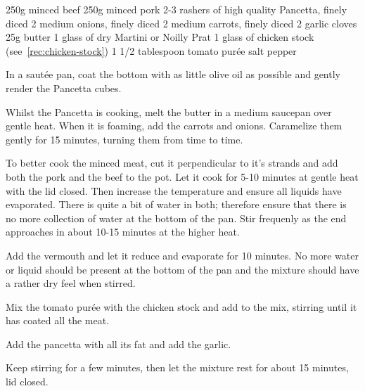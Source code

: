 \begin{ingreds}
	250g minced beef
	250g minced pork
	2-3 rashers of high quality Pancetta, finely diced
     	2 medium onions, finely diced
	2 medium carrots, finely diced
	2 garlic cloves
     	25g butter
     	1 glass of dry Martini or Noilly Prat
	1 glass of chicken stock (see~\ref{rec:chicken-stock})
	1 1/2 tablespoon tomato pur\'ee
	salt
	pepper

\end{ingreds}

\begin{method}
	In a saut\'ee pan, coat the bottom with as little olive oil as possible and gently render the Pancetta cubes.

     	Whilst the Pancetta is cooking, melt  the butter in a medium saucepan over gentle heat.  When it is foaming, add the carrots and onions.  Caramelize them gently for 15 minutes, turning them from time to time.

	To better cook the minced meat, cut it perpendicular to it's strands and add both the pork and the beef to the pot.  Let it cook for 5-10 minutes at gentle heat with the lid closed.  Then increase the temperature and ensure all liquids have evaporated.  There is quite a bit of water in both; therefore ensure that there is no more collection of water at the bottom of the pan.  Stir frequenly as the end approaches in about 10-15 minutes at the higher heat.

	Add the vermouth and let it reduce and evaporate for 10 minutes.  No more water or liquid should be present at the bottom of the pan and the mixture should have a rather dry feel when stirred.

	Mix the tomato pur\'ee with the chicken stock and add to the mix, stirring until it has coated all the meat.

	Add the pancetta with all its fat and add the garlic.

	Keep stirring for a few minutes, then let the mixture rest for about 15 minutes, lid closed.
	
\end {method}